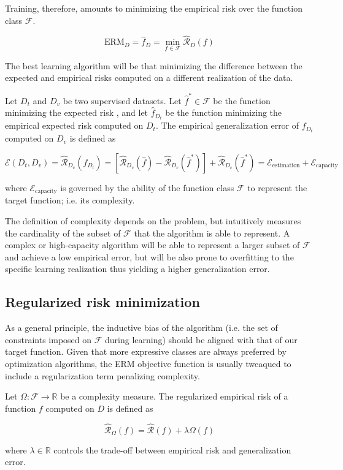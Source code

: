 Training, therefore, amounts to minimizing the empirical risk over the function class $\mathcal{F}$.

$$
\text{ERM}_D = \hat{f}_D = \min_{f \in \mathcal{F}} \hat{\mathcal{R}}_D(f)
$$

The best learning algorithm will be that minimizing the difference between the 
expected and empirical risks computed on a different realization of the data. 

\begin{definition} Let $D_{t}$ and $D_v$ be two supervised datasets. Let $\hat{f}^* \in \mathcal{F}$ be the function minimizing the expected risk
    , and let $\hat{f}_{D_t}$ be the function minimizing the empirical expected risk computed on $D_t$. The empirical generalization error of $f_{D_t}$ computed on $D_v$ is defined as

    $$
    \mathcal{E}(D_t, D_v) = \hat{\mathcal{R}}_{D_v}(\hat{f}_{D_t}) = [\hat{\mathcal{R}}_{D_v}(\hat{f}) - \hat{\mathcal{R}}_{D_v}(\hat{f}^*)] + \hat{\mathcal{R}}_{D_v}(\hat{f}^*) = \mathcal{E}_{\text{estimation}}+ \mathcal{E}_{\text{capacity}}
    $$

    where $\mathcal{E}_{\text{capacity}}$ is governed by the ability of the function class $\mathcal{F}$ to represent the target function; i.e. its complexity.
\end{definition}


The definition of complexity depends on the problem, but intuitively measures the cardinality of the
subset of $\mathcal{F}$ that the algorithm is able to represent. A complex or high-capacity algorithm will
be able to represent a larger subset of $\mathcal{F}$ and achieve a low empirical error, but will be also
prone to overfitting to the specific learning realization thus yielding a higher generalization error. 

\subsection{Regularized risk minimization}

As a general principle, the inductive bias of the algorithm (i.e. the set of constraints imposed on $\mathcal{F}$ during learning) should be aligned with
that of our target function. Given that more expressive classes are always preferred by optimization algorithms, the ERM
objective function is usually tweaqued to include a regularization term penalizing complexity.

\begin{definition} Let $\Omega: \mathcal{F} \to \mathbb{R}$ be a complexity measure. The regularized empirical risk of a function $f$
    computed on $D$ is defined as

    $$
    \hat{\mathcal{R}}_{\Omega}(f)=\hat{\mathcal{R}}(f) + \lambda \Omega(f)
    $$

    where $\lambda \in \mathbb{R}$ controls the trade-off between empirical risk and generalization error.

\end{definition}

